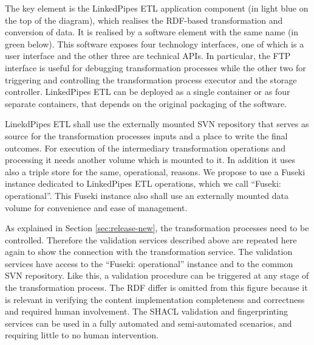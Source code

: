 	The key element is the LinkedPipes ETL application component (in light blue on the top of the diagram), which realises the RDF-based transformation and conversion of data. It is realised by a software element with the same name (in green below). This software exposes four technology interfaces, one of which is a user interface and the other three are technical APIs. In particular, the FTP interface is useful for debugging transformation processes while the other two for triggering and controlling the transformation process executor and the storage controller. LinkedPipes ETL can be deployed as a single container or as four separate containers, that depends on the original packaging of the software. 
	
	LinekdPipes ETL shall use the externally mounted SVN repository that serves as source for the transformation processes inputs and a place to write the final outcomes. For execution of the intermediary transformation operations and processing it needs another volume which is mounted to it. In addition it uses also a triple store for the same, operational, reasons. We propose to use a Fuseki instance dedicated to LinkedPipes ETL operations, which we call ``Fuseki: operational''. This Fuseki instance also shall use an externally mounted data volume for convenience and ease of management. 
	
	As explained in Section \ref{sec:release-new}, the transformation processes need to be controlled. Therefore the validation services described above are repeated here again to show the connection with the transformation service. The validation services have access to the ``Fuseki: operational'' instance and to the common SVN repository. Like this, a validation procedure can be triggered at any stage of the transformation process. The RDF differ is omitted from this figure because it is relevant in verifying the content implementation completeness and correctness and required human involvement. The SHACL validation and fingerprinting services can be used in a fully automated and semi-automated scenarios, and requiring little to no human intervention.
		
		
	
	
